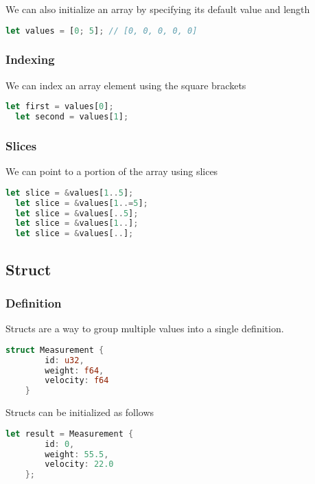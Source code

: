 \documentclass{article}
\begin{document}
We can also initialize an array by specifying its default value and length

\begin{lstlisting}[language=Rust, style=boxed, numbers=none]
  let values = [0; 5]; // [0, 0, 0, 0, 0]
\end{lstlisting}

\subsubsection{Indexing}

We can index an array element using the square brackets

\begin{lstlisting}[language=Rust, style=boxed, numbers=none]
  let first = values[0];
  let second = values[1];
\end{lstlisting}

\subsubsection{Slices}

We can point to a portion of the array using slices

\begin{lstlisting}[language=Rust, style=boxed, numbers=none]
  let slice = &values[1..5];
  let slice = &values[1..=5];
  let slice = &values[..5];
  let slice = &values[1..];
  let slice = &values[..];
\end{lstlisting}

\subsection{Struct}

\subsubsection{Definition}

Structs are a way to group multiple values
into a single definition.

\begin{lstlisting}[language=Rust, style=boxed, numbers=none]
    struct Measurement {
        id: u32,
        weight: f64,
        velocity: f64
    }
\end{lstlisting}

Structs can be initialized as follows

\begin{lstlisting}[language=Rust, style=boxed, numbers=none]
    let result = Measurement {
        id: 0,
        weight: 55.5,
        velocity: 22.0
    };
\end{lstlisting}
\end{document}
